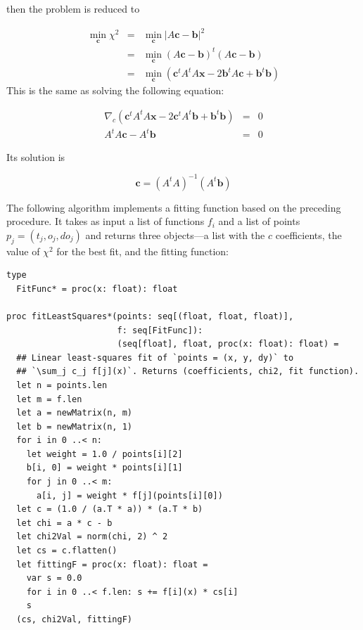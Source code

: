 \documentclass[justified, sixbynine]{tufte-book}
\def\ft{\small\tt}
\theoremstyle{plain}%
\newtheorem * {corollary}{Corollary}
\theoremstyle{definition}
\theoremstyle{remark}
\newtheorem * {remark}{Remark}
\newtheorem * {note}{Note}
\begin{document}
\begin{fullwidth}
then the problem is reduced to

\begin{eqnarray}
\min_{\mathbf{c}}\chi^2 &=& \min_{\mathbf{c}} |A\mathbf{c}-\mathbf{b}|^2 \\
  &=& \min_{\mathbf{c}} (A\mathbf{c}-\mathbf{b})^t (A\mathbf{c}-\mathbf{b}) \\
  &=& \min_{\mathbf{c}} (\mathbf{c}^t A^t A \mathbf x - 2\mathbf{b}^t A \mathbf{c} + \mathbf{b}^t \mathbf{b})
\end{eqnarray}
This is the same as solving the following equation:

\begin{eqnarray}
\nabla_{c} (\mathbf{c}^t A^t A \mathbf x - 2\mathbf{c}^t A^t \mathbf{b} + \mathbf{b}^t\mathbf{b}) &=& 0 \\
A^t A \mathbf{c} - A^t \mathbf{b} &=& 0
\end{eqnarray}

Its solution is

\begin{equation}
\mathbf{c} = (A^t A)^{-1} (A^t \mathbf{b})
\end{equation}

The following algorithm implements a fitting function based on the preceding procedure. It takes as input a list of functions $f_i$ and a list of points $p_j=(t_j, o_j, do_j)$ and returns three objects---a list with the $c$ coefficients, the value of $\chi^2$ for the best fit, and the fitting function:

\begin{lstlisting}[caption={in file: {\ft nlib/fitting.nim}}]
type
  FitFunc* = proc(x: float): float

proc fitLeastSquares*(points: seq[(float, float, float)],
                      f: seq[FitFunc]):
                      (seq[float], float, proc(x: float): float) =
  ## Linear least-squares fit of `points = (x, y, dy)` to
  ## `\sum_j c_j f[j](x)`. Returns (coefficients, chi2, fit function).
  let n = points.len
  let m = f.len
  let a = newMatrix(n, m)
  let b = newMatrix(n, 1)
  for i in 0 ..< n:
    let weight = 1.0 / points[i][2]
    b[i, 0] = weight * points[i][1]
    for j in 0 ..< m:
      a[i, j] = weight * f[j](points[i][0])
  let c = (1.0 / (a.T * a)) * (a.T * b)
  let chi = a * c - b
  let chi2Val = norm(chi, 2) ^ 2
  let cs = c.flatten()
  let fittingF = proc(x: float): float =
    var s = 0.0
    for i in 0 ..< f.len: s += f[i](x) * cs[i]
    s
  (cs, chi2Val, fittingF)


\end{lstlisting}
\end{fullwidth}
\end{document}
